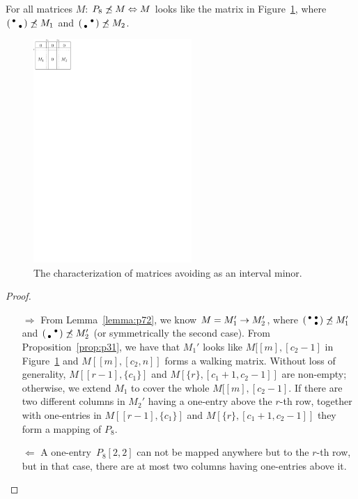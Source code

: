 \begin{prop}
\label{prop:p72}
For all matrices $M$: $P_8\not\preceq M\Leftrightarrow M$ looks like the matrix in Figure~\ref{fig:p72}, where $\left(\begin{smallmatrix}\bullet& \\ &\bullet\end{smallmatrix}\right)\not\preceq M_1$ and $\left(\begin{smallmatrix} &\bullet\\\bullet& \end{smallmatrix}\right)\not\preceq M_2$.
\end{prop}
\begin{figure}[!ht]
\centering
\includegraphics[width=60mm]{img/p72.pdf}
\caption{The characterization of matrices avoiding \usebox{\smlmatc} as an interval minor.}
\label{fig:p72}
\end{figure}
\begin{proof}
\begin{itemize}
	\item[$\Rightarrow$] From Lemma~\ref{lemma:p72}, we know $M=M_1'\rightarrow M_2'$, where $\left(\begin{smallmatrix}\bullet&\bullet\\ &\bullet\end{smallmatrix}\right)\not\preceq M_1'$ and $\left(\begin{smallmatrix} &\bullet\\\bullet& \end{smallmatrix}\right)\not\preceq M_2'$ (or symmetrically the second case). From Proposition~\ref{prop:p31}, we have that $M_1'$ looks like $M[[m],[c_2-1]$ in Figure~\ref{fig:p72} and $M[[m],[c_2,n]]$ forms a walking matrix. Without loss of generality, $M[[r-1],\{c_1\}]$ and $M[\{r\},[c_1+1,c_2-1]]$ are non-empty; otherwise, we extend $M_1$ to cover the whole $M[[m],[c_2-1]$. If there are two different columns in $M_2'$ having a one-entry above the $r$-th row, together with one-entries in $M[[r-1],\{c_1\}]$ and $M[\{r\},[c_1+1,c_2-1]]$ they form a mapping of $P_8$.
	\item[$\Leftarrow$] A one-entry~$P_8[2,2]$ can not be mapped anywhere but to the $r$-th row, but in that case, there are at most two columns having one-entries above it.
\end{itemize}
\end{proof}

